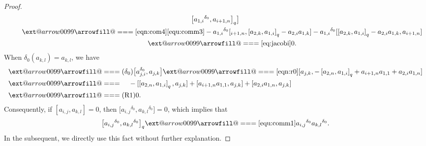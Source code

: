 \documentclass[10pt,a4paper]{amsart}
\makeatletter
\def\x@arrow{\DOTSB\Relbar}
\def\xlongequalsignfill@{\arrowfill@\x@arrow\Relbar\x@arrow}
\providecommand{\xlongequal}[2][]{%
	\ext@arrow 0099\xlongequalsignfill@{#1}{#2}}
\numberwithin{equation}{section}
\def\lr#1{\left[#1\right]}
\def\d{\delta}
\makeatother
\begin{document}
\begin{proof}
\begin{gather*}
 \bigl[{a_{1,i}}^{\d_0}, a_{i+1,n}\bigr]_q \bigr]\\
\qquad \xlongequal[\eqref{eqn:com4}]{\eqref{equ:comm3}} -{a_{1,i}}^{\d_0}[_{i+1, n}, \lr{a_{2, k}, a_{1, i}}_q-a_{2, i}a_{1, k} ]-{a_{1,i}}^{\d_0}[ \lr{a_{2, k}, a_{1, i}}_q-a_{2, i}a_{1, k} , a_{i+1,n}]\\
 \qquad\xlongequal{\eqref{eq:jacobi}} 0.
\end{gather*}
When $\d_0(a_{k,l})=a_{k,l}$, we have
\begin{align*}
[\d_0(a_{1,i}),\d_0(a_{j,k})]&\xlongequal{(\d_0)}\bigl[a_{j,i}^{\d_0}, a_{j,k}\bigr]\xlongequal{\eqref{eqn:r0}}[a_{j,k},-\lr{a_{2,n},a_{1,i}}_q+a_{i+1,n}a_{1,1}+a_{2,i}a_{1,n}]\\
&\xlongequal{\quad}-[\lr{a_{2,n}, a_{1,i}}_q, a_{j,k}]+\lr{a_{i+1,n}a_{1,1}, a_{j,k}}+\lr{a_{2,i}a_{1,n}, a_{j,k}}\\
 &\xlongequal{(\textrm{R1})}0.
 \end{align*}
Consequently, if $\lr{a_{i,j}, a_{k,l}}=0$, then $\bigl[{a_{i,j}}^{\d_0},{a_{k,l}}^{\d_0}\bigr]=0$, which implies that
\begin{equation*}
\bigl[{a_{i,j}}^{\d_0},{a_{k,l}}^{\d_0}\bigr]_q\xlongequal{\eqref{equ:comm1}} {a_{i,j}}^{\d_0}{a_{k,l}}^{\d_0}.
\end{equation*}
In the subsequent, we directly use this fact without further explanation.


\end{proof}
\end{document}
